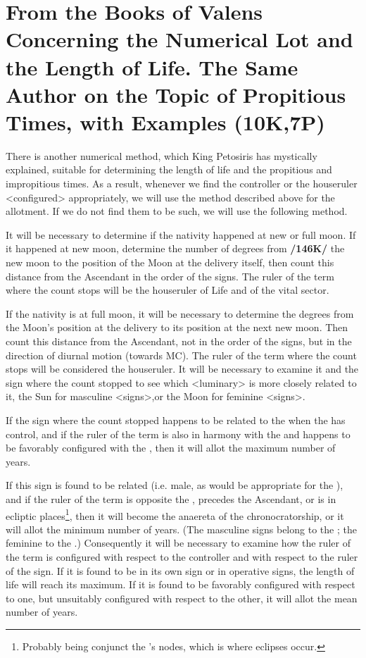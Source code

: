 \section{From the Books of Valens Concerning the Numerical Lot and the Length of Life. The Same Author on the Topic of Propitious Times, with Examples (10K,7P)}

There is another numerical method, which  King Petosiris has mystically explained, suitable for determining the length of life and the propitious and impropitious times. As a result, whenever we find the controller or the houseruler <configured> appropriately, we will use the method described above for the allotment. If we do not find them to be such, we will use the following method.

It will be necessary to determine if the nativity happened at new or full moon. If it happened at new moon, determine the number of degrees from \textbf{/146K/} the new moon to the position of the Moon at the delivery itself, then count this distance from the Ascendant in the order of the signs. The ruler of the term where the count stops will be the houseruler of Life and of the vital sector. 

If the nativity is at full moon, it will be necessary to determine the degrees from the Moon’s position at the delivery to its position at the next new moon. Then count this distance from the Ascendant, not in the order of the signs, but in the
direction of diurnal motion (towards MC). The ruler of the term where the count stops will be considered the houseruler. It will be necessary to examine it and the sign where the count stopped to see which <luminary> is more closely related to it, the Sun for masculine <signs>,or the Moon for feminine <signs>.

If the sign where the count stopped happens to be related to the \Sun\xspace when the \Sun\xspace has control, and if the
ruler of the term is also in harmony with the \Sun\xspace and happens to be favorably configured with the \Sun, then
it will allot the maximum number of years. 

If this sign is found to be related (i.e. male, as would be appropriate for the \Sun), and if the ruler of the term is opposite the \Sun, precedes the Ascendant, or is in ecliptic places\footnote{Probably being conjunct the \Moon's nodes, which is where eclipses occur.}, then it will become the anaereta of the chronocratorship, or it will allot the minimum number of years. (The masculine signs belong to the \Sun; the feminine to the \Moon.) Consequently it will be necessary to examine how the ruler of the term is configured with respect to the controller and with respect to the ruler of the sign. If it is found to be in its own sign or in operative signs, the length of life will reach its maximum. If it is found to be favorably configured with respect to one, but unsuitably configured with respect to the other, it will allot the mean number of years. 

